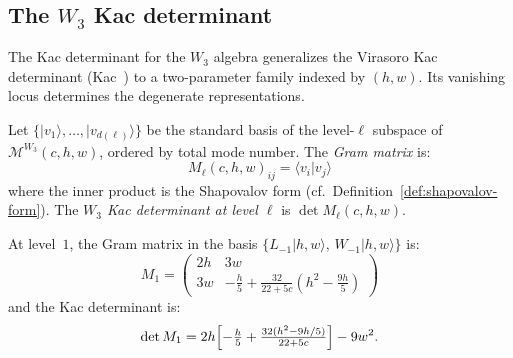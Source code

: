 \subsection{\texorpdfstring{The $W_3$ Kac determinant}{The W3 Kac determinant}}
\label{sec:w3-kac-determinant}

The Kac determinant for the $W_3$ algebra generalizes the Virasoro
Kac determinant (Kac~\cite{Kac}) to a two-parameter family indexed
by $(h, w)$.  Its vanishing locus determines the degenerate
representations.

\begin{definition}
\label{def:w3-gram-matrix}
Let $\{|v_1\rangle, \ldots, |v_{d(\ell)}\rangle\}$ be the standard
basis of the level-$\ell$ subspace of $\mathcal{M}^{W_3}(c,h,w)$,
ordered by total mode number.  The \emph{Gram matrix} is:
\[
M_\ell(c,h,w)_{ij} = \langle v_i | v_j \rangle
\]
where the inner product is the Shapovalov form
(cf.\ Definition~\ref{def:shapovalov-form}).  The
\emph{$W_3$ Kac determinant at level $\ell$} is
$\det M_\ell(c,h,w)$.
\end{definition}

\begin{theorem}\label{thm:w3-kac-level1}
At level~$1$, the Gram matrix in the basis
$\{L_{-1}|h,w\rangle,\, W_{-1}|h,w\rangle\}$ is:
\begin{equation}\label{eq:w3-gram-level1}
M_1 = \begin{pmatrix}
2h & 3w \\
3w & -\frac{h}{5} + \frac{32}{22+5c}(h^2 - \frac{9h}{5})
\end{pmatrix}
\end{equation}
and the Kac determinant is:
\begin{equation}\label{eq:w3-det-level1}
\det M_1 = 2h\Bigl[-\tfrac{h}{5}
  + \tfrac{32(h^2 - 9h/5)}{22+5c}\Bigr] - 9w^2.
\end{equation}
\end{theorem}

